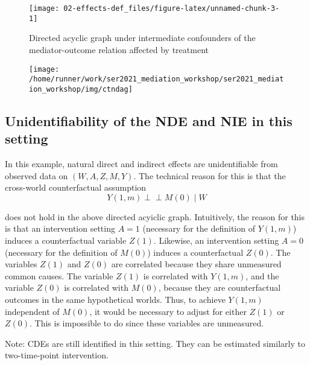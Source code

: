 \documentclass[
  12pt,
]{book}
\theoremstyle{definition}
\theoremstyle{definition}
\theoremstyle{definition}
\newcommand{\indep}{\mbox{$\perp\!\!\!\perp$}}
\newcommand{\1}{\mathbbm{1}}
\begin{document}
\begin{figure}

{\centering \texttt{[image: 02-effects-def\_files/figure-latex/unnamed-chunk-3-1]} 

}

\caption{Directed acyclic graph under intermediate confounders of the mediator-outcome relation affected by treatment}\label{fig:unnamed-chunk-3}
\end{figure}

\begin{figure}

{\centering \texttt{[image: /home/runner/work/ser2021\_mediation\_workshop/ser2021\_mediation\_workshop/img/ctndag]} 

}

\end{figure}

\hypertarget{unidentifiability-of-the-nde-and-nie-in-this-setting}{%
\subsection{Unidentifiability of the NDE and NIE in this setting}\label{unidentifiability-of-the-nde-and-nie-in-this-setting}}

In this example, natural direct and indirect effects are
unidentifiable from observed data on \((W,A,Z,M,Y)\). The technical
reason for this is that the cross-world counterfactual assumption
\begin{equation*}
  Y(1,m)\indep M(0)\mid W
\end{equation*}

does not hold in the above directed acyiclic graph. Intuitively, the
reason for this is that an intervention setting \(A=1\) (necessary for
the definition of \(Y(1,m)\)) induces a counterfactual variable
\(Z(1)\). Likewise, an intervention setting \(A=0\) (necessary for the
definition of \(M(0)\)) induces a counterfactual \(Z(0)\). The variables
\(Z(1)\) and \(Z(0)\) are correlated because they share unmeasured common
causes. The variable \(Z(1)\) is correlated with \(Y(1,m)\), and the
variable \(Z(0)\) is correlated with \(M(0)\), because they are
counterfactual outcomes in the same hypothetical worlds. Thus, to
achieve \(Y(1,m)\) independent of \(M(0)\), it would be necessary to
adjust for either \(Z(1)\) or \(Z(0)\). This is impossible to do since
these variables are unmeasured.

Note: CDEs are still identified in this setting. They can be estimated similarly to two-time-point intervention.
\end{document}
